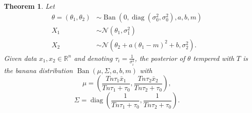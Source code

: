 \documentclass[english,twoside,openright]{HYgraduMLDS}
\newtheorem{theorem}{Theorem}
\newcommand{\R}{\mathbb{R}}
\newcommand{\caln}{{\mathcal{N}}}
\DeclareMathOperator{\ban}{Ban}
\DeclareMathOperator{\diag}{diag}
\begin{document}
\begin{theorem}\label{banana_posterior_theorem}
    Let
    \begin{align*}
        \theta = (\theta_1, \theta_2) &\sim
        \ban(0, \diag(\sigma_0^2, \sigma_0^2), a, b, m) \\
        X_1 &\sim \caln(\theta_1, \sigma_1^2) \\
        X_2 &\sim \caln(\theta_2 + a(\theta_1 - m)^2 + b, \sigma_2^2).
    \end{align*}
    Given data \(x_1, x_2\in \R^n\) and
    denoting \(\tau_i = \frac{1}{\sigma_i^2}\),
    the posterior of \(\theta\) tempered with \(T\) is the banana distribution
    \(\ban(\mu, \Sigma, a, b, m)\)
    with
    \[
        \mu = \left(\frac{Tn\tau_1\bar{x}_1}{Tn\tau_1 + \tau_0},
        \frac{Tn\tau_2\bar{x}_2}{Tn\tau_2 + \tau_0}\right),
    \]
    \[
        \Sigma = \diag\left(
            \frac{1}{Tn\tau_1 + \tau_0},
            \frac{1}{Tn\tau_2 + \tau_0}
        \right).
    \]
\end{theorem}
\end{document}

